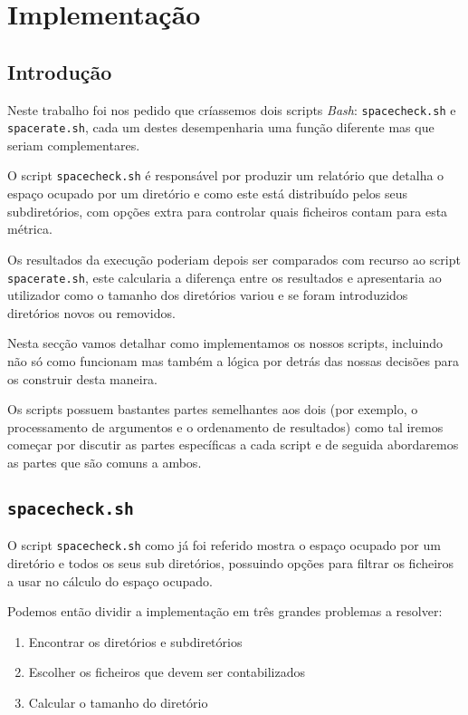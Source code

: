 \chapter{Implementação}

\section{Introdução}

Neste trabalho foi nos pedido que críassemos dois scripts \emph{Bash}:
\Verb|spacecheck.sh| e \Verb|spacerate.sh|, cada um destes desempenharia uma
função diferente mas que seriam complementares.

O script \Verb|spacecheck.sh| é responsável por produzir um relatório que
detalha o espaço ocupado por um diretório e como este está distribuído pelos
seus subdiretórios, com opções extra para controlar quais ficheiros contam para
esta métrica.

Os resultados da execução poderiam depois ser comparados com recurso ao script
\Verb|spacerate.sh|, este calcularia a diferença entre os resultados e
apresentaria ao utilizador como o tamanho dos diretórios variou e se foram
introduzidos diretórios novos ou removidos.

Nesta secção vamos detalhar como implementamos os nossos scripts, incluindo não
só como funcionam mas também a lógica por detrás das nossas decisões para os
construir desta maneira.

Os scripts possuem bastantes partes semelhantes aos dois (por exemplo, o
processamento de argumentos e o ordenamento de resultados) como tal iremos
começar por discutir as partes específicas a cada script e de seguida
abordaremos as partes que são comuns a ambos.

\cprotect\section{\Verb|spacecheck.sh|}\label{sec:implementation_spacecheck}

O script \Verb|spacecheck.sh| como já foi referido mostra o espaço ocupado por
um diretório e todos os seus sub diretórios, possuindo opções para filtrar os
ficheiros a usar no cálculo do espaço ocupado.

Podemos então dividir a implementação em três grandes problemas a resolver:

\begin{enumerate}
	\item Encontrar os diretórios e subdiretórios
	\item Escolher os ficheiros que devem ser contabilizados
	\item Calcular o tamanho do diretório
\end{enumerate}

